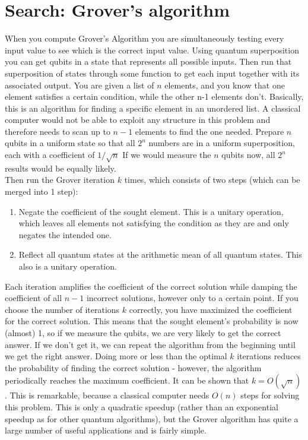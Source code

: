 \section{Search: Grover's algorithm}
When you compute Grover's Algorithm you are simultaneously testing every input value to see which is the correct input value. Using quantum superposition you can get qubits in a state that represents all possible inputs. Then run that superposition of states through some function to get each input together with its associated output. You are given a list of $n$ elements, and you know that one element satisfies a certain condition, while the other n-1 elements don't. Basically, this is an algorithm for finding a specific element in an unordered list. A classical computer would not be able to exploit any structure in this problem and therefore needs to scan up to $n-1$ elements to find the one needed.
Prepare $n$ qubits in a uniform state so that all $2^n$ numbers are in a uniform superposition, each with a coefficient of $1/\sqrt{n}$ If we would measure the $n$ qubits now, all $2^n$ results would be equally likely.\\
Then run the Grover iteration $k$ times, which consists of two steps (which can be merged into 1 step):
\begin{enumerate}
\item Negate the coefficient of the sought element. This is a unitary operation, which leaves all elements not satisfying the condition as they are and only negates the intended one.
\item Reflect all quantum states at the arithmetic mean of all quantum states. This also is a unitary operation.
\end{enumerate}
Each iteration amplifies the coefficient of the correct solution while damping the coefficient of all $n-1$ incorrect solutions, however only to a certain point.
If you choose the number of iterations $k$ correctly, you have maximized the coefficient for the correct solution. This means that the sought element's probability is now (almost) 1, so if we measure the qubits, we are very likely to get the correct answer. If we don't get it, we can repeat the algorithm from the beginning until we get the right answer. Doing more or less than the optimal $k$ iterations reduces the probability of finding the correct solution - however, the algorithm periodically reaches the maximum coefficient.
It can be shown that $k=O(\sqrt{n})$. This is remarkable, because a classical computer needs $O(n)$ steps for solving this problem. This is only a quadratic speedup (rather than an exponential speedup as for other quantum algorithms), but the Grover algorithm has quite a large number of useful applications and is fairly simple.
